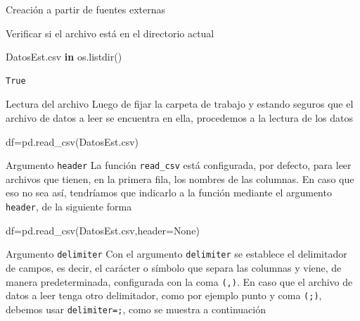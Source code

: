\documentclass[
  ignorenonframetext,
  aspectratio=169,
  spanish,
]{beamer}
\newenvironment{Shaded}{\begin{snugshade}}{\end{snugshade}}
\newcommand{\CommentTok}[1]{\textcolor[rgb]{0.37,0.37,0.37}{#1}}
\newcommand{\KeywordTok}[1]{\textcolor[rgb]{0.00,0.23,0.31}{\textbf{#1}}}
\newcommand{\NormalTok}[1]{\textcolor[rgb]{0.00,0.23,0.31}{#1}}
\newcommand{\OperatorTok}[1]{\textcolor[rgb]{0.37,0.37,0.37}{#1}}
\newcommand{\StringTok}[1]{\textcolor[rgb]{0.13,0.47,0.30}{#1}}
\newcommand{\VariableTok}[1]{\textcolor[rgb]{0.07,0.07,0.07}{#1}}
\begin{document}
\begin{frame}[fragile]{Creación a partir de fuentes externas}
\begin{block}{Verificar si el archivo está en el directorio actual}
\begin{Shaded}
\begin{Highlighting}[]
\CommentTok{\textquotesingle{}DatosEst.csv\textquotesingle{}} \KeywordTok{in}\NormalTok{ os.listdir()}
\end{Highlighting}
\end{Shaded}

\begin{verbatim}
True
\end{verbatim}
\end{block}

\begin{block}{Lectura del archivo}
\label{lectura-del-archivo}
Luego de fijar la carpeta de trabajo y estando seguros que el archivo de
datos a leer se encuentra en ella, procedemos a la lectura de los datos

\begin{Shaded}
\begin{Highlighting}[]
\NormalTok{df}\OperatorTok{=}\NormalTok{pd.read\_csv(}\StringTok{\textquotesingle{}DatosEst.csv\textquotesingle{}}\NormalTok{)}
\end{Highlighting}
\end{Shaded}
\end{block}

\begin{block}{Argumento \texttt{header}}
\label{argumento-header}
La función \texttt{read\_csv} está configurada, por defecto, para leer
archivos que tienen, en la primera fila, los nombres de las columnas. En
caso que eso no sea así, tendríamos que indicarlo a la función mediante
el argumento \texttt{header}, de la siguiente forma

\begin{Shaded}
\begin{Highlighting}[]
\NormalTok{df}\OperatorTok{=}\NormalTok{pd.read\_csv(}\StringTok{\textquotesingle{}DatosEst.csv\textquotesingle{}}\NormalTok{,header}\OperatorTok{=}\VariableTok{None}\NormalTok{)}
\end{Highlighting}
\end{Shaded}
\end{block}

\begin{block}{Argumento \texttt{delimiter}}
\label{argumento-delimiter}
Con el argumento \texttt{delimiter} se establece el delimitador de
campos, es decir, el carácter o símbolo que separa las columnas y viene,
de manera predeterminada, configurada con la coma \texttt{(,)}. En caso
que el archivo de datos a leer tenga otro delimitador, como por ejemplo
punto y coma \texttt{(;)}, debemos usar
\texttt{delimiter=\textquotesingle{};\textquotesingle{}}, como se
muestra a continuación


\end{block}
\end{frame}
\end{document}
